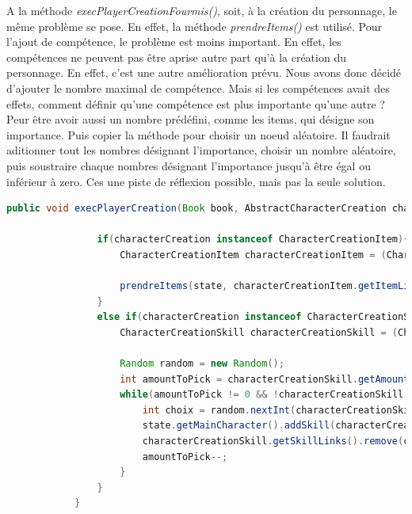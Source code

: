 		A la méthode \textit{execPlayerCreationFourmis()}, soit, à la création du personnage, le même problème se pose. En effet, la méthode \textit{prendreItems()} est utilisé. Pour l'ajout de compétence, le problème est moins important. En effet, les compétences ne peuvent pas être aprise autre part qu'à la création du personnage. En effet, c'est une autre amélioration prévu. Nous avons donc décidé d'ajouter le nombre maximal de compétence. Mais si les compétences avait des effets, comment définir qu'une compétence est plus importante qu'une autre ? Peur être avoir aussi un nombre prédéfini, comme les items, qui désigne son importance. Puis copier la méthode pour choisir un noeud aléatoire. Il faudrait aditionner tout les nombres désignant l'importance, choisir un nombre aléatoire, puis soustraire chaque nombres désignant l'importance jusqu'à être égal ou inférieur à zero. Ces une piste de réflexion possible, mais pas la seule solution.

		\begin{lstlisting}[gobble=12, language=java, label=execPlayerCreationFourmis, caption=execPlayerCreation() de Fourmis]
			public void execPlayerCreation(Book book, AbstractCharacterCreation characterCreation, BookState state) {

				if(characterCreation instanceof CharacterCreationItem){
					CharacterCreationItem characterCreationItem = (CharacterCreationItem) characterCreation;

					prendreItems(state, characterCreationItem.getItemLinks(), characterCreationItem.getAmountToPick());
				}
				else if(characterCreation instanceof CharacterCreationSkill){
					CharacterCreationSkill characterCreationSkill = (CharacterCreationSkill) characterCreation;

					Random random = new Random();
					int amountToPick = characterCreationSkill.getAmountToPick();
					while(amountToPick != 0 && !characterCreationSkill.getSkillLinks().isEmpty()) {
						int choix = random.nextInt(characterCreationSkill.getSkillLinks().size());
						state.getMainCharacter().addSkill(characterCreationSkill.getSkillLinks().get(choix));
						characterCreationSkill.getSkillLinks().remove(choix);
						amountToPick--;
					}
				}
			}
		\end{lstlisting}

